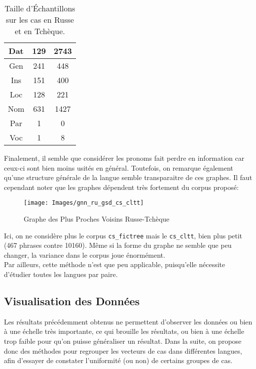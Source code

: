 \documentclass{article}
\begin{document}
\begin{table}[h]
{\begin{minipage}{.45\textwidth}
\begin{center}
\begin{tabular}{ccc}
                Dat & 129 & 2743\\
                \midrule
                Gen & 241 & 448\\
                \midrule
                Ins & 151 & 400\\
                \midrule
                Loc & 128 & 221\\
                \midrule
                Nom & 631 & 1427\\
                \midrule
                Par & 1 & 0\\
                \midrule
                Voc & 1 & 8\\
                \bottomrule
        \end{tabular}
        \end{center}
        \end{minipage}}
        \caption{Taille d'Échantillons sur les cas en Russe et en Tchèque.}
\end{table}

Finalement, il semble que considérer les pronoms fait perdre en information car ceux-ci sont bien moins usités en général. Toutefois, on remarque également qu'une structure générale de la langue semble transparaitre de ces graphes.
Il faut cependant noter que les graphes dépendent très fortement du corpus proposé:

\begin{figure}[h]
        \centering
        \texttt{[image: Images/gnn\_ru\_gsd\_cs\_cltt]}
        \caption{Graphe des Plus Proches Voisins Russe-Tchèque}
        \label{GNNRuCz}
\end{figure}

Ici, on ne considère plus le corpus \texttt{cs\_fictree} mais le \texttt{cs\_cltt}, bien plus petit (467 phrases contre 10160).
Même si la forme du graphe ne semble que peu changer, la variance dans le corpus joue énormément.\\
Par ailleurs, cette méthode n'est que peu applicable, puisqu'elle nécessite d'étudier toutes les langues par paire.

\subsection{Visualisation des Données}\label{subsec:vis}
Les résultats précédemment obtenus ne permettent d'observer les données ou bien à une échelle très importante, ce qui brouille les résultats, ou bien à une échelle trop faible pour qu'on puisse généraliser un résultat.
Dans la suite, on propose donc des méthodes pour regrouper les vecteurs de cas dans différentes langues, afin d'essayer de constater l'uniformité (ou non) de certains groupes de cas.
\end{document}
